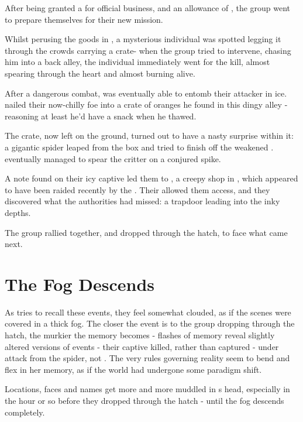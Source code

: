 \documentclass[oneside, 9pt,english]{extbook}
\begin{document}
After being granted a  for official business, and an allowance of , the group went to prepare themselves for their new mission.

Whilst perusing the goods in , a mysterious individual was spotted legging it through the crowds carrying a crate- when the group tried to intervene, chasing him into a back alley, the individual immediately went for the kill, almost spearing  through the heart and almost burning  alive.
 
 After a dangerous combat,  was eventually able to entomb their attacker in ice.  nailed their now-chilly foe into a crate of oranges he found in this dingy alley - reasoning at least he'd have a snack when he thawed.
 
 The crate, now left on the ground, turned out to have a nasty surprise within it: a gigantic spider leaped from the box and tried to finish off the weakened .  eventually managed to spear the critter on a conjured spike. 
 
 A note found on their icy captive led them to , a creepy shop in , which appeared to have been raided recently by the . Their  allowed them access, and they discovered what the authorities had missed: a trapdoor leading into the inky depths. 
 
 The group rallied together, and dropped through the hatch, to face what came next. 
  
	\section{The Fog Descends}

	As  tries to recall these events, they feel somewhat clouded, as if the scenes were covered in a thick fog. The closer the event is to the group dropping through the hatch, the murkier the memory becomes - flashes of memory reveal slightly altered versions of events - their captive killed, rather than captured -  under attack from the spider, not . The very rules governing reality seem to bend and flex in her memory, as if the world had undergone some paradigm shift. 
	
	Locations, faces and names get more and more muddled in s head, especially in the hour or so before they dropped through the hatch - until the fog descends completely.
\end{document}
